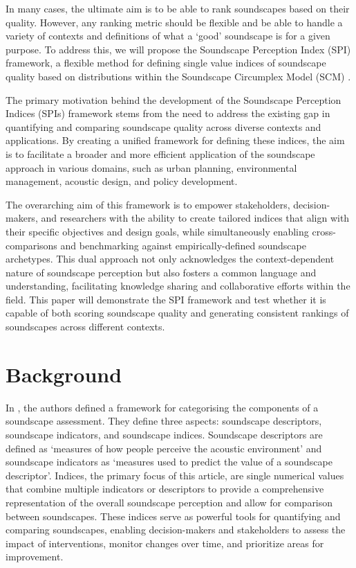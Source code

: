 \documentclass[
  authoryear,
  preprint,
  3p]{elsarticle}
\begin{document}
In many cases, the ultimate aim is to be able to rank soundscapes based
on their quality. However, any ranking metric should be flexible and be
able to handle a variety of contexts and definitions of what a `good'
soundscape is for a given purpose. To address this, we will propose the
Soundscape Perception Index (SPI) framework, a flexible method for
defining single value indices of soundscape quality based on
distributions within the Soundscape Circumplex Model (SCM)
\citep[\citet{Axelsson2012Swedish},
\citet{Mitchell2022How}]{Axelsson2010principal}.

The primary motivation behind the development of the Soundscape
Perception Indices (SPIs) framework stems from the need to address the
existing gap in quantifying and comparing soundscape quality across
diverse contexts and applications. By creating a unified framework for
defining these indices, the aim is to facilitate a broader and more
efficient application of the soundscape approach in various domains,
such as urban planning, environmental management, acoustic design, and
policy development.

The overarching aim of this framework is to empower stakeholders,
decision-makers, and researchers with the ability to create tailored
indices that align with their specific objectives and design goals,
while simultaneously enabling cross-comparisons and benchmarking against
empirically-defined soundscape archetypes. This dual approach not only
acknowledges the context-dependent nature of soundscape perception but
also fosters a common language and understanding, facilitating knowledge
sharing and collaborative efforts within the field. This paper will
demonstrate the SPI framework and test whether it is capable of both
scoring soundscape quality and generating consistent rankings of
soundscapes across different contexts.

\section{Background}\label{background}

In \citet{Aletta2016Soundscape}, the authors defined a framework for
categorising the components of a soundscape assessment. They define
three aspects: soundscape descriptors, soundscape indicators, and
soundscape indices. Soundscape descriptors are defined as `measures of
how people perceive the acoustic environment' and soundscape indicators
as `measures used to predict the value of a soundscape descriptor'.
Indices, the primary focus of this article, are single numerical values
that combine multiple indicators or descriptors to provide a
comprehensive representation of the overall soundscape perception and
allow for comparison between soundscapes. These indices serve as
powerful tools for quantifying and comparing soundscapes, enabling
decision-makers and stakeholders to assess the impact of interventions,
monitor changes over time, and prioritize areas for
improvement\citep{Kang2019Towards}.
\end{document}
